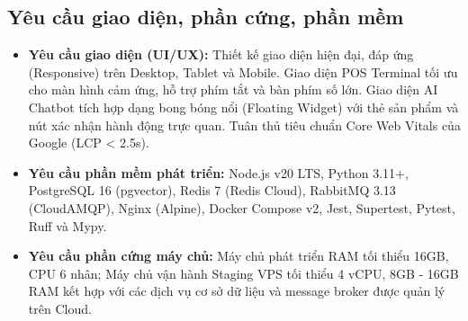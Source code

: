 \documentclass[12pt,a4paper]{report}
\begin{document}
\subsection{Yêu cầu giao diện, phần cứng, phần mềm}
\begin{itemize}
    \item \textbf{Yêu cầu giao diện (UI/UX):} Thiết kế giao diện hiện đại, đáp ứng (Responsive) trên Desktop, Tablet và Mobile. Giao diện POS Terminal tối ưu cho màn hình cảm ứng, hỗ trợ phím tắt và bàn phím số lớn. Giao diện AI Chatbot tích hợp dạng bong bóng nổi (Floating Widget) với thẻ sản phẩm và nút xác nhận hành động trực quan. Tuân thủ tiêu chuẩn Core Web Vitals của Google (LCP < 2.5s).
    \item \textbf{Yêu cầu phần mềm phát triển:} Node.js v20 LTS, Python 3.11+, PostgreSQL 16 (pgvector), Redis 7 (Redis Cloud), RabbitMQ 3.13 (CloudAMQP), Nginx (Alpine), Docker Compose v2, Jest, Supertest, Pytest, Ruff và Mypy.
    \item \textbf{Yêu cầu phần cứng máy chủ:} Máy chủ phát triển RAM tối thiểu 16GB, CPU 6 nhân; Máy chủ vận hành Staging VPS tối thiểu 4 vCPU, 8GB - 16GB RAM kết hợp với các dịch vụ cơ sở dữ liệu và message broker được quản lý trên Cloud.
\end{itemize}
\end{document}
